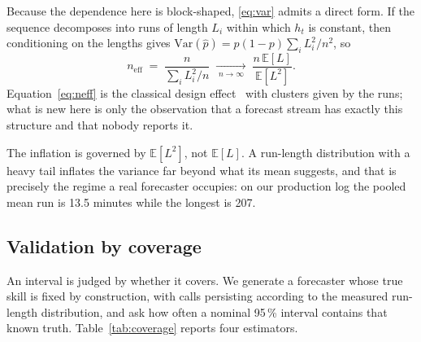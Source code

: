 \documentclass[conference]{IEEEtran}
\begin{document}
Because the dependence here is block-shaped, \eqref{eq:var} admits a direct
form. If the sequence decomposes into runs of length $L_i$ within which $h_t$ is
constant, then conditioning on the lengths gives
$\mathrm{Var}(\hat{p}) = p(1-p)\sum_i L_i^2 / n^2$, so
\begin{equation}
n_{\text{eff}} \;=\; \frac{n}{\sum_i L_i^{2} / n}
\;\xrightarrow[\;n\to\infty\;]{}\; \frac{n\,\mathbb{E}[L]}{\mathbb{E}[L^{2}]}.
\label{eq:neff}
\end{equation}
Equation~\eqref{eq:neff} is the classical design effect~\cite{kish1965,moulton1990}
with clusters given by the runs; what is new here is only the observation that a
forecast stream has exactly this structure and that nobody reports it.

The inflation is governed by $\mathbb{E}[L^2]$, not $\mathbb{E}[L]$. A
run-length distribution with a heavy tail inflates the variance far beyond what
its mean suggests, and that is precisely the regime a real forecaster occupies:
on our production log the pooled mean run is 13.5 minutes while the longest is
207.

\subsection{Validation by coverage}

An interval is judged by whether it covers. We generate a forecaster whose true
skill is fixed by construction, with calls persisting according to the measured
run-length distribution, and ask how often a nominal 95\,\% interval contains
that known truth. Table~\ref{tab:coverage} reports four estimators.
\end{document}
